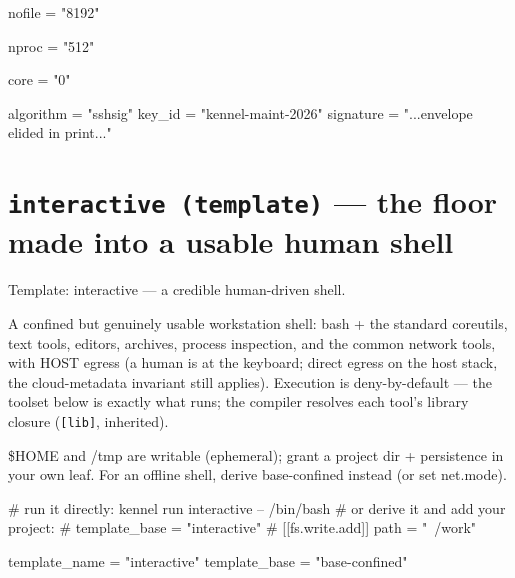 \begin{kennelcode}
[ulimits]
\end{kennelcode}

\begin{kennelcode}
nofile = "8192"
\end{kennelcode}

\begin{kennelcode}
nproc  = "512"
\end{kennelcode}

\begin{kennelcode}
core   = "0"
\end{kennelcode}

\begin{kennelcode}
[signature]
algorithm = "sshsig"
key_id = "kennel-maint-2026"
signature = "...envelope elided in print..."
\end{kennelcode}

\hypertarget{interactive-template-the-floor-made-into-a-usable-human-shell}{%
\section{\texorpdfstring{\texttt{interactive\ (template)} --- the floor
made into a usable human
shell}{interactive (template) --- the floor made into a usable human shell}}\label{interactive-template-the-floor-made-into-a-usable-human-shell}}

Template: interactive --- a credible human-driven shell.

A confined but genuinely usable workstation shell: bash + the standard
coreutils, text tools, editors, archives, process inspection, and the
common network tools, with HOST egress (a human is at the keyboard;
direct egress on the host stack, the cloud-metadata invariant still
applies). Execution is deny-by-default --- the toolset below is exactly
what runs; the compiler resolves each tool's library closure
(\texttt{{[}lib{]}}, inherited).

\$HOME and /tmp are writable (ephemeral); grant a project dir +
persistence in your own leaf. For an offline shell, derive base-confined
instead (or set net.mode).

\begin{kennelcode}
# run it directly:
kennel run interactive -- /bin/bash
# or derive it and add your project:
#   template_base = "interactive"
#   [[fs.write.add]] path = "~/work"
\end{kennelcode}

\begin{kennelcode}
template_name = "interactive"
template_base = "base-confined"
\end{kennelcode}


